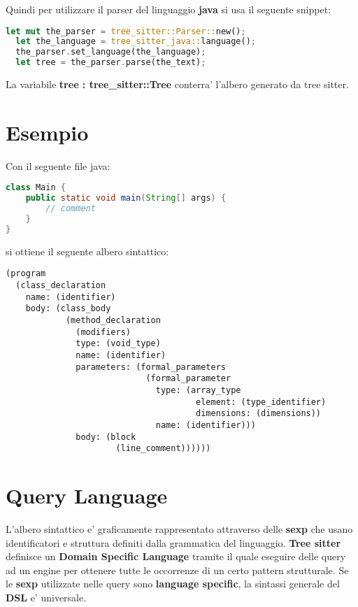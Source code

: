 Quindi per utilizzare il parser del linguaggio \textbf{java} si usa il seguente snippet:

\begin{lstlisting}[language=Rust]
  let mut the_parser = tree_sitter::Parser::new();
  let the_language = tree_sitter_java::language();
  the_parser.set_language(the_language);
  let tree = the_parser.parse(the_text);
\end{lstlisting}

La variabile \textbf{tree : tree\_sitter::Tree} conterra' l'albero generato da tree sitter.


\section{Esempio}

Con il seguente file java:

\begin{lstlisting}[language=Java]
class Main {
	public static void main(String[] args) {
    	// comment
    }
}
\end{lstlisting}

si ottiene il seguente albero sintattico:

\begin{lstlisting}
(program
  (class_declaration
    name: (identifier)
    body: (class_body
            (method_declaration
              (modifiers)
              type: (void_type)
              name: (identifier)
              parameters: (formal_parameters
                            (formal_parameter
                              type: (array_type
                                      element: (type_identifier)
                                      dimensions: (dimensions))
                              name: (identifier)))
              body: (block
                      (line_comment))))))
\end{lstlisting}

\section{Query Language}

L'albero sintattico e' graficamente rappresentato attraverso delle \textbf{sexp} che usano identificatori e struttura definiti dalla grammatica del linguaggio.
\textbf{Tree sitter} definisce un \textbf{Domain Specific Language} \cite{TreeSitterQuerySyntax} tramite il quale eseguire delle query ad un engine per ottenere tutte le occorrenze di un certo pattern strutturale.
Se le \textbf{sexp} utilizzate nelle query sono \textbf{language specific},  la sintassi generale del \textbf{DSL} e' universale.

